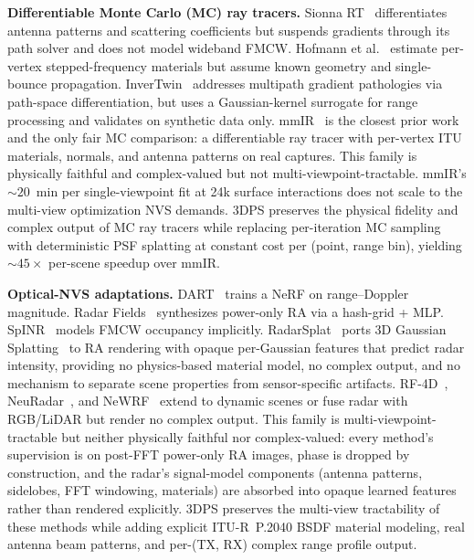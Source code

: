 \textbf{Differentiable Monte Carlo (MC) ray tracers.}
Sionna RT~\cite{sionna} differentiates antenna patterns and scattering coefficients but suspends gradients through its path solver and does not model wideband FMCW. Hofmann et al.~\cite{hofmann2025inverse} estimate per-vertex stepped-frequency materials but assume known geometry and single-bounce propagation. InverTwin~\cite{chen2025invertwin} addresses multipath gradient pathologies via path-space differentiation, but uses a Gaussian-kernel surrogate for range processing and validates on synthetic data only. mmIR~\cite{mmIR2026} is the closest prior work and the only fair MC comparison: a differentiable ray tracer with per-vertex ITU materials, normals, and antenna patterns on real captures. This family is physically faithful and complex-valued but not multi-viewpoint-tractable. mmIR's ${\sim}20$~min per single-viewpoint fit at 24k surface interactions does not scale to the multi-view optimization NVS demands. 3DPS preserves the physical fidelity and complex output of MC ray tracers while replacing per-iteration MC sampling with deterministic PSF splatting at constant cost per (point, range bin), yielding ${\sim}45\times$ per-scene speedup over mmIR.

\textbf{Optical-NVS adaptations.}
DART~\cite{huang2024dart} trains a NeRF on range--Doppler magnitude. Radar Fields~\cite{10.1145/3641519.3657510} synthesizes power-only RA via a hash-grid + MLP. SpINR~\cite{takawale2025spinr} models FMCW occupancy implicitly. RadarSplat~\cite{kung2025radarsplat} ports 3D Gaussian Splatting~\cite{3dgs} to RA rendering with opaque per-Gaussian features that predict radar intensity, providing no physics-based material model, no complex output, and no mechanism to separate scene properties from sensor-specific artifacts. RF-4D~\cite{zhang2025rf4d}, NeuRadar~\cite{rafidashti2025neuradar}, and NeWRF~\cite{lu2024newrf} extend to dynamic scenes or fuse radar with RGB/LiDAR but render no complex output. This family is multi-viewpoint-tractable but neither physically faithful nor complex-valued: every method's supervision is on post-FFT power-only RA images, phase is dropped by construction, and the radar's signal-model components (antenna patterns, sidelobes, FFT windowing, materials) are absorbed into opaque learned features rather than rendered explicitly. 3DPS preserves the multi-view tractability of these methods while adding explicit ITU-R~P.2040 BSDF material modeling, real antenna beam patterns, and per-(TX, RX) complex range profile output.

